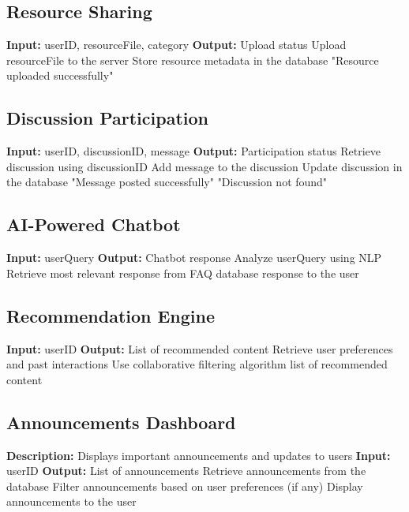 \subsection{Resource Sharing}
\begin{algorithmic}[1]
\State \textbf{Input:} userID, resourceFile, category
\State \textbf{Output:} Upload status
\State
\State Upload resourceFile to the server
\State Store resource metadata in the database
\State \Return "Resource uploaded successfully"
\end{algorithmic}

\subsection{Discussion Participation}
\begin{algorithmic}[1]
\State \textbf{Input:} userID, discussionID, message
\State \textbf{Output:} Participation status
\State
\State Retrieve discussion using discussionID
    \State Add message to the discussion
    \State Update discussion in the database
    \State \Return "Message posted successfully"
\Else
    \State \Return "Discussion not found"
\EndIf
\end{algorithmic}

\vspace{2cm}

\subsection{AI-Powered Chatbot}
\begin{algorithmic}[1]
\State \textbf{Input:} userQuery
\State \textbf{Output:} Chatbot response
\State
\State Analyze userQuery using NLP
\State Retrieve most relevant response from FAQ database
\State \Return response to the user
\end{algorithmic}

\subsection{Recommendation Engine}
\begin{algorithmic}[1]
\State \textbf{Input:} userID
\State \textbf{Output:} List of recommended content
\State
\State Retrieve user preferences and past interactions
\State Use collaborative filtering algorithm
\State \Return list of recommended content
\end{algorithmic}

\subsection{Announcements Dashboard}
\begin{algorithmic}[1]
\State \textbf{Description:} Displays important announcements and updates to users
\State
\State \textbf{Input:} userID
\State \textbf{Output:} List of announcements
\State
\State Retrieve announcements from the database
\State Filter announcements based on user preferences (if any)
\State Display announcements to the user
\end{algorithmic}

